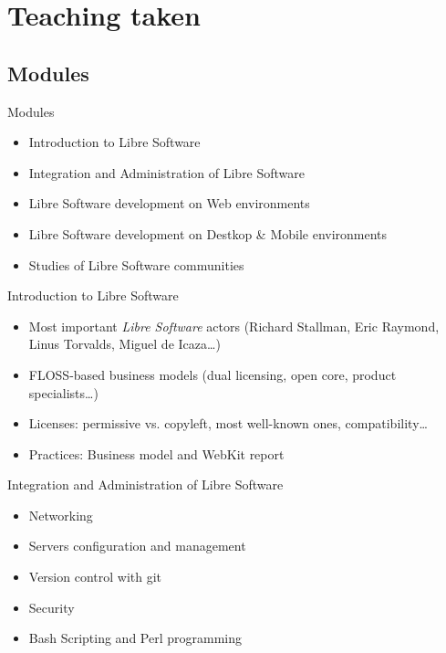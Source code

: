 \documentclass{beamer}
\begin{document}
\section{Teaching taken}

\subsection{Modules}

\begin{frame}{Modules}
\begin{itemize}
  \item Introduction to Libre Software
  \item Integration and Administration of Libre Software
  \item Libre Software development on Web environments
  \item Libre Software development on Destkop \& Mobile environments
  \item Studies of Libre Software communities
\end{itemize}
\end{frame}

\begin{frame}{Introduction to Libre Software}
\begin{itemize}
  \item Most important {\it Libre Software} actors (Richard Stallman, Eric Raymond, Linus Torvalds, Miguel de Icaza\dots)
  \item FLOSS-based business models (dual licensing, open core, product specialists\dots)
  \item Licenses: permissive vs. copyleft, most well-known ones, compatibility\dots
  \item Practices: Business model and WebKit report
\end{itemize}
\end{frame}

\begin{frame}{Integration and Administration of Libre Software}
\begin{itemize}
  \item Networking
  \item Servers configuration and management
  \item Version control with git
  \item Security
  \item Bash Scripting and Perl programming
\end{itemize}
\end{frame}
\end{document}
